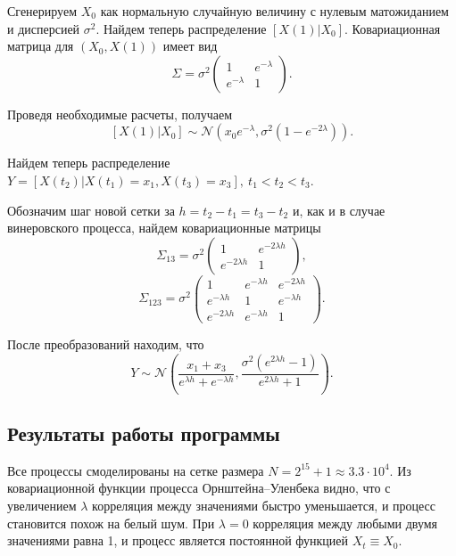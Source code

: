 \documentclass[16pt]{article}
\begin{document}
Сгенерируем $X_0$ как нормальную случайную величину с нулевым матожиданием и дисперсией $\sigma^2$.
Найдем теперь распределение $[X(1)|X_0]$.
Ковариационная матрица для $(X_0, X(1))$ имеет вид 
$$
\Sigma = \sigma^2 \begin{pmatrix} 
1 & e^{-\lambda} \\
e^{-\lambda} & 1
\end{pmatrix}.
$$

Проведя необходимые расчеты, получаем $$[X(1)|X_0] \sim \mathcal{N}\left(x_0e^{-\lambda}, \sigma^2 (1 -e^{-2\lambda})\right).$$

Найдем теперь распределение $Y = [X(t_2)|X(t_1) = x_1, X(t_3) = x_3],\ t_1 < t_2 < t_3$.

Обозначим шаг новой сетки за $h = t_2 - t_1 = t_3 - t_2$ и, как и в случае винеровского процесса, найдем ковариационные матрицы
$$
\Sigma_{13} = \sigma^2 \begin{pmatrix} 
1 & e^{-2\lambda h} \\
e^{-2 \lambda h} & 1
\end{pmatrix},
$$
$$
\Sigma_{123} = \sigma^2 \begin{pmatrix}
1 & e^{-\lambda h} & e^{-2 \lambda h} \\
e^{-\lambda h} & 1 & e^{-\lambda h} \\
e^{-2\lambda h} & e^{-\lambda h} & 1
\end{pmatrix}.
$$

После преобразований находим, что $$Y \sim \mathcal{N}\left(\dfrac{x_1 + x_3}{e^{\lambda h} + e^{-\lambda h}},\dfrac{\sigma^2 (e^{2\lambda h} - 1)}{e^{2\lambda h} + 1}\right).$$
\subsection{Результаты работы программы}

Все процессы смоделированы на сетке размера $N = 2^{15} + 1 \approx 3.3 \cdot 10^4$. Из ковариационной функции процесса Орнштейна--Уленбека видно, что с увеличением $\lambda$ корреляция между значениями быстро уменьшается, и процесс становится похож на белый шум. При  $\lambda = 0$ корреляция между любыми двумя значениями равна 1, и процесс является постоянной функцией $X_t \equiv X_0$.
\end{document}
